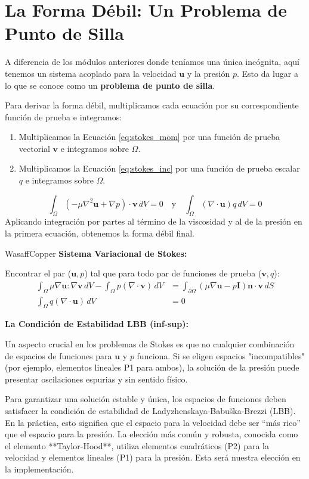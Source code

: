 \section{La Forma Débil: Un Problema de Punto de Silla}
A diferencia de los módulos anteriores donde teníamos una única incógnita, aquí tenemos un sistema acoplado para la velocidad $\mathbf{u}$ y la presión $p$. Esto da lugar a lo que se conoce como un \textbf{problema de punto de silla}.

Para derivar la forma débil, multiplicamos cada ecuación por su correspondiente función de prueba e integramos:
\begin{enumerate}
    \item Multiplicamos la Ecuación \ref{eq:stokes_mom} por una función de prueba vectorial $\mathbf{v}$ e integramos sobre $\Omega$.
    \item Multiplicamos la Ecuación \ref{eq:stokes_inc} por una función de prueba escalar $q$ e integramos sobre $\Omega$.
\end{enumerate}
$$ \int_{\Omega} (-\mu \nabla^2 \mathbf{u} + \nabla p) \cdot \mathbf{v} \, dV = 0 \quad \text{y} \quad \int_{\Omega} (\nabla \cdot \mathbf{u}) q \, dV = 0 $$
Aplicando integración por partes al término de la viscosidad y al de la presión en la primera ecuación, obtenemos la forma débil final.

\begin{keybox}{WasaffCopper}
    \textbf{Sistema Variacional de Stokes:}
    
    Encontrar el par ($\mathbf{u}, p$) tal que para todo par de funciones de prueba ($\mathbf{v}, q$):
    \begin{align}
        \int_{\Omega} \mu \nabla\mathbf{u} : \nabla\mathbf{v} \, dV - \int_{\Omega} p (\nabla \cdot \mathbf{v}) \, dV &= \int_{\partial\Omega} (\mu \nabla\mathbf{u} - p\mathbf{I})\mathbf{n} \cdot \mathbf{v} \, dS \\
        \int_{\Omega} q (\nabla \cdot \mathbf{u}) \, dV &= 0
    \end{align}
\end{keybox}

\begin{notatecnica}
    \textbf{La Condición de Estabilidad LBB (inf-sup):}
    
    Un aspecto crucial en los problemas de Stokes es que no cualquier combinación de espacios de funciones para $\mathbf{u}$ y $p$ funciona. Si se eligen espacios "incompatibles" (por ejemplo, elementos lineales P1 para ambos), la solución de la presión puede presentar oscilaciones espurias y sin sentido físico.
    
    Para garantizar una solución estable y única, los espacios de funciones deben satisfacer la condición de estabilidad de Ladyzhenskaya-Babuška-Brezzi (LBB). En la práctica, esto significa que el espacio para la velocidad debe ser ``más rico'' que el espacio para la presión. La elección más común y robusta, conocida como el elemento **Taylor-Hood**, utiliza elementos cuadráticos (P2) para la velocidad y elementos lineales (P1) para la presión. Esta será nuestra elección en la implementación.
\end{notatecnica}
